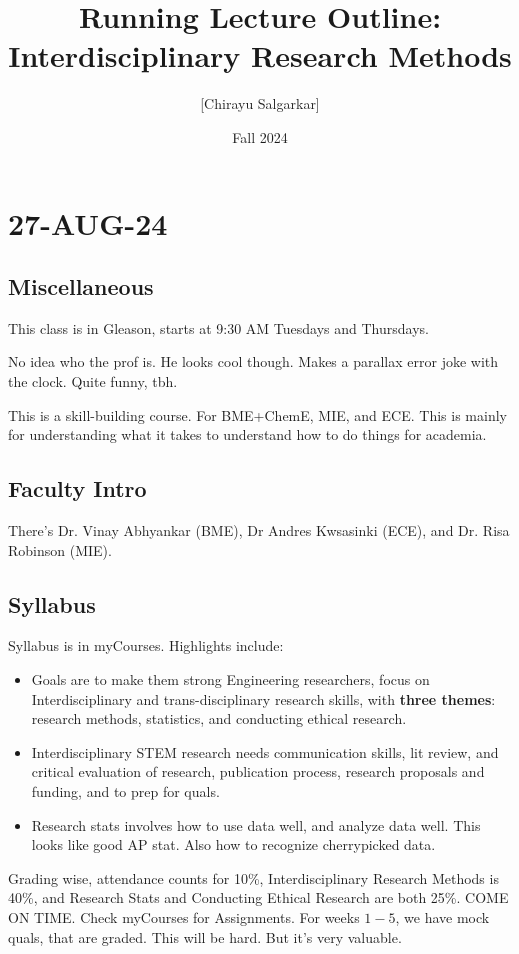 \documentclass[10pt, oneside]{article}
\title{Running Lecture Outline: Interdisciplinary Research Methods}
\author{[Chirayu Salgarkar]}
\date{Fall 2024}
\begin{document}
\maketitle
\tableofcontents

\vspace{.25in}

\section{27-AUG-24}

\subsection{Miscellaneous}

This class is in Gleason, starts at 9:30 AM Tuesdays and Thursdays.


No idea who the prof is. He looks cool though. Makes a parallax error joke with the clock. Quite funny, tbh.


This is a skill-building course. For BME+ChemE, MIE, and ECE. This is mainly for understanding what it takes to understand how to do things for academia. 

\subsection{Faculty Intro}
There's Dr. Vinay Abhyankar (BME), Dr Andres Kwsasinki (ECE), and Dr. Risa Robinson (MIE). 
\subsection{Syllabus}
Syllabus is in myCourses. Highlights include:
\begin{itemize}
    \item Goals are to make them strong Engineering researchers, focus on Interdisciplinary and trans-disciplinary research skills, with \textbf{three themes}: research methods, statistics, and conducting ethical research.
    \item Interdisciplinary STEM research needs communication skills, lit review, and critical evaluation of research, publication process, research proposals and funding, and to prep for quals. 
    \item Research stats involves how to use data well, and analyze data well. This looks like good AP stat. Also how to recognize cherrypicked data. 
\end{itemize}
Grading wise, attendance counts for 10\%, Interdisciplinary Research Methods is 40\%, and Research Stats and Conducting Ethical Research are both 25\%. COME ON TIME. Check myCourses for Assignments. For weeks $1-5$, we have mock quals, that are graded. This will be hard. But it's very valuable. 
\end{document}
